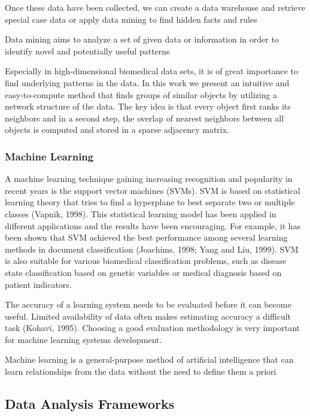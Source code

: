 \documentclass[10pt,a4paper]{article}
\begin{document}
	Once these data have been collected, we
	can create a data warehouse and retrieve
	special case data or apply data mining to
	find hidden facts and rules \cite{bellazzi2011data}
	
	 Data mining
	aims to analyze a set of given data or information in order to identify novel
	and potentially useful patterns \cite{chen2006medical}
	
	Especially in high-dimensional biomedical data sets, it is of great importance to find underlying patterns in the data. In this work we present an intuitive and easy-to-compute method that finds groups of similar objects by utilizing a network structure of the data. The key idea is that every object first ranks its neighbors and in a second step, the overlap of nearest neighbors between all objects is computed and stored in a sparse adjacency matrix. \cite{7024124}
	
	\subsubsection{Machine Learning}
	
	A machine learning technique gaining increasing recognition and
	popularity in recent years is the support vector machines (SVMs). SVM is
	based on statistical learning theory that tries to find a hyperplane to best
	separate two or multiple classes (Vapnik, 1998). This statistical learning
	model has been applied in different applications and the results have been
	encouraging. For example, it has been shown that SVM achieved the best
	performance among several learning methods in document classification
	(Joachims, 1998; Yang and Liu, 1999). SVM is also suitable for various
	biomedical classification problems, such as disease state classification based
	on genetic variables or medical diagnosis based on patient indicators. \cite{chen2006medical}
	
	The accuracy of a learning system needs to be evaluated before it can
	become useful. Limited availability of data often makes estimating accuracy
	a difficult task (Kohavi, 1995). Choosing a good evaluation methodology is
	very important for machine learning systems development. \cite{chen2006medical}
	
	Machine learning is a general-purpose method of artificial intelligence that can learn relationships from the data without the need to define them a priori \cite{doi:10.1093/bib/bbx044}
	
	\subsection{Data Analysis Frameworks}
	
\end{document}
